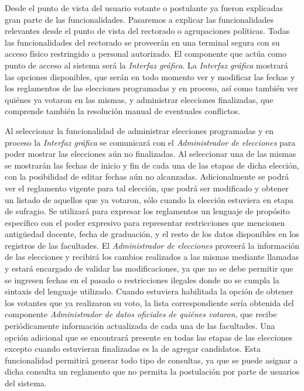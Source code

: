 


Desde el punto de vista del usuario votante o postulante ya fueron explicadas gran parte de las funcionalidades. Pasaremos a explicar las funcionalidades relevantes desde el punto de vista del rectorado o agrupaciones políticas. 
Todas las funcionalidades del rectorado se proveerán en una terminal segura con su acceso físico restringido a personal autorizado. El componente que actúa como punto de acceso al sistema será la \emph{Interfaz gráfica}. 
La \emph{Interfaz gráfica} mostrará las opciones disponibles, que serán en todo momento ver y modificar las fechas y los reglamentos de las elecciones programadas y en proceso, así como también ver quiénes ya votaron en las mismas, y administrar elecciones finalizadas, que comprende también la resolución manual de eventuales conflictos.


Al seleccionar la funcionalidad de administrar elecciones programadas y en proceso la \emph{Interfaz gráfica} se comunicará con el \emph{Administrador de elecciones} para poder mostrar las elecciones aún no finalizadas. Al seleccionar una de las mismas se mostrarán las fechas de inicio y fin de cada una de las etapas de dicha elección, con la posibilidad de editar fechas aún no alcanzadas. Adicionalmente se podrá ver el reglamento vigente para tal elección, que podrá ser modificado y obtener un listado de aquellos que ya votaron, sólo cuando la elección estuviera en etapa de sufragio. Se utilizará para expresar los reglamentos un lenguaje de propósito específico con el poder expresivo para representar restricciones que mencionen antig\"uedad docente, fecha de graduación, y el resto de los datos disponibles en los registros de las facultades. El \emph{Administrador de elecciones} proveerá la información de las elecciones y recibirá los cambios realizados a las mismas mediante llamadas y estará encargado de validar las modificaciones, ya que no se debe permitir que se ingresen fechas en el pasado o restricciones ilegales donde no se cumpla la sintaxis del lenguaje utilizado. Cuando estuviera habilitada la opción de obtener los votantes que ya realizaron su voto, la lista correspondiente sería obtenida del componente \emph{Administrador de datos oficiales de quiénes votaron}, que recibe periódicamente información actualizada de cada una de las facultades. Una opción adicional que se encontrará presente en todas las etapas de las elecciones excepto cuando estuvieran finalizadas es la de agregar candidatos. Esta funcionalidad permitirá generar todo tipo de consultas, ya que se puede asignar a dicha consulta un reglamento que no permita la postulación por parte de usuarios del sistema. 

